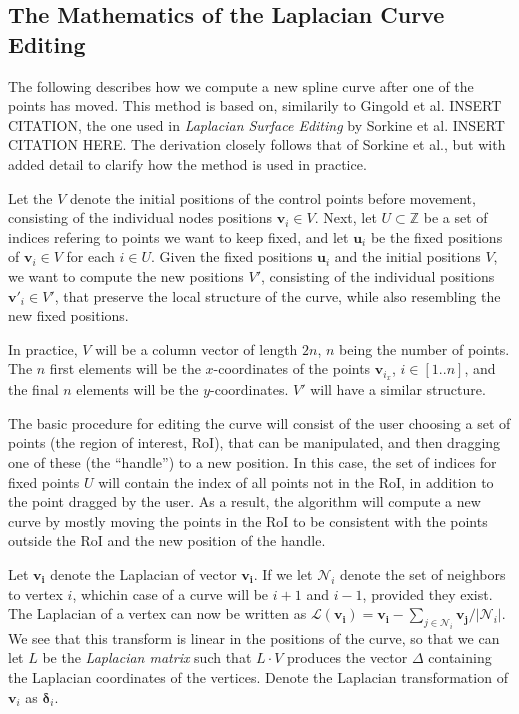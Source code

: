 \documentclass[english]{article}
\begin{document}
\subsection{The Mathematics of the Laplacian Curve Editing}

The following describes how we compute a new spline curve after one of the points has moved. This method is based on, similarily to Gingold et al. INSERT CITATION, the one used in \textit{Laplacian Surface Editing} by Sorkine et al. INSERT CITATION HERE. The derivation closely follows that of Sorkine et al., but with added detail to clarify how the method is used in practice.

Let the $V$ denote the initial positions of the control points before movement, consisting of the individual nodes positions $\mathbf{v}_i \in V$. Next, let $U \subset \mathbb{Z}$ be a set of indices refering to points we want to keep fixed, and let $\mathbf{u}_i$ be the fixed positions of $\mathbf{v}_i \in V$ for each $ i \in U$. Given the fixed positions $\mathbf{u}_i$ and the initial positions $V$, we want to compute the new positions $V'$, consisting of the individual positions $\mathbf{v}'_i \in V'$, that preserve the local structure of the curve, while also resembling the new fixed positions.

In practice, $V$ will be a column vector of length $2n$, $n$ being the number of points. The $n$ first elements will be the $x$-coordinates of the points $\mathbf{v}_{i_x}$, $i \in [1..n]$, and the final $n$ elements will be the $y$-coordinates. $V'$ will have a similar structure.

The basic procedure for editing the curve will consist of the user choosing a set of points (the region of interest, RoI), that can be manipulated, and then dragging one of these (the ``handle'') to a new position. In this case, the set of indices for fixed points $U$ will contain the index of all points not in the RoI, in addition to the point dragged by the user. As a result, the algorithm will compute a new curve by mostly moving the points in the RoI to be consistent with the points outside the RoI and the new position of the handle.

Let $\mathcal{\mathbf{v_i}}$ denote the Laplacian of vector $\mathbf{v_i}$. If we let $\mathcal{N}_i$ denote the set of neighbors to vertex $i$, whichin case of a curve  will be $i+1$ and $i - 1$, provided they exist. The Laplacian of a vertex can now be written as $\mathcal{L}(\mathbf{v_i}) = \mathbf{v_i} - \sum_{j \in \mathcal{N}_i}\mathbf{v_j} / |\mathcal{N}_i|$. We see that this transform is linear in the positions of the curve, so that we can let $L$ be the \textit{Laplacian matrix} such that $L\cdot V$ produces the vector $\Delta$ containing the Laplacian coordinates of the vertices. Denote the Laplacian transformation of $\mathbf{v}_i$ as $\mathbf{\delta}_i$.
\end{document}
